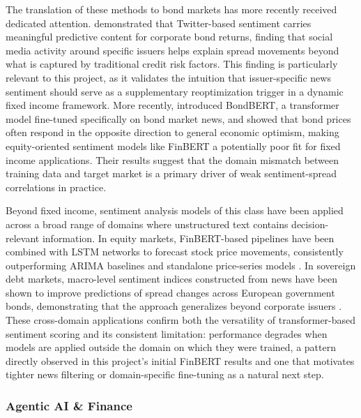 \documentclass[12pt]{article}
\begin{document}
The translation of these methods to bond markets has more recently received dedicated attention. \textcite{Bartov2022TheTwitter} demonstrated that Twitter-based sentiment carries meaningful predictive content for corporate bond returns, finding that social media activity around specific issuers helps explain spread movements beyond what is captured by traditional credit risk factors. This finding is particularly relevant to this project, as it validates the intuition that issuer-specific news sentiment should serve as a supplementary reoptimization trigger in a dynamic fixed income framework. More recently, \textcite{Barter2025BondBERT:Market} introduced BondBERT, a transformer model fine-tuned specifically on bond market news, and showed that bond prices often respond in the opposite direction to general economic optimism, making equity-oriented sentiment models like FinBERT a potentially poor fit for fixed income applications. Their results suggest that the domain mismatch between training data and target market is a primary driver of weak sentiment-spread correlations in practice.

Beyond fixed income, sentiment analysis models of this class have been applied across a broad range of domains where unstructured text contains decision-relevant information. In equity markets, FinBERT-based pipelines have been combined with LSTM networks to forecast stock price movements, consistently outperforming ARIMA baselines and standalone price-series models \parencite{Araci2019FinBERT:Models}. In sovereign debt markets, macro-level sentiment indices constructed from news have been shown to improve predictions of spread changes across European government bonds, demonstrating that the approach generalizes beyond corporate issuers \parencite{Barter2025BondBERT:Market}. These cross-domain applications confirm both the versatility of transformer-based sentiment scoring and its consistent limitation: performance degrades when models are applied outside the domain on which they were trained, a pattern directly observed in this project's initial FinBERT results and one that motivates tighter news filtering or domain-specific fine-tuning as a natural next step.

\subsubsection{Agentic AI \& Finance} 
\end{document}
